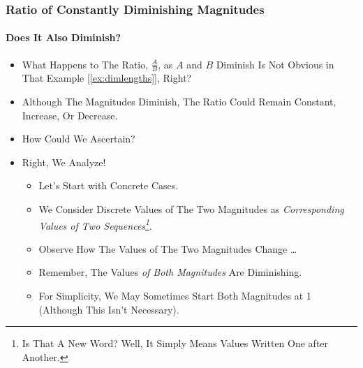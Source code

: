 \documentclass{beamer}
\begin{document}
\begin{frame}
\frametitle{Ratio of Constantly Diminishing Magnitudes}
\framesubtitle{Does It Also Diminish?}
\label{slide:dimmag2}
\begin{itemize}
\pause
\item What Happens to The Ratio, \alert{$\frac{A}{B}$}, as $A$ and $B$ Diminish \alert{Is Not Obvious in That Example [\ref{ex:dimlengths}]}, Right?
\pause
\item Although The {Magnitudes Diminish}, The \alert{Ratio Could Remain Constant, Increase, Or Decrease}.
\pause
\item How Could We Ascertain?
\pause
\item Right, We Analyze!
\begin{itemize}
\pause
\item Let's Start with Concrete Cases.
\pause
\item We Consider Discrete Values of The Two Magnitudes as \textit{Corresponding Values of Two Sequences\footnote{Is That A New Word? Well, It Simply Means Values Written One after Another.}}.
\pause
\item Observe How The Values of The Two Magnitudes Change \dots
\pause
\item Remember, The Values \textit{of Both Magnitudes} Are Diminishing.
\item For Simplicity, We May Sometimes Start Both Magnitudes at 1 (Although This Isn't Necessary).
\end{itemize}
\end{itemize}
\end{frame}
\end{document}
